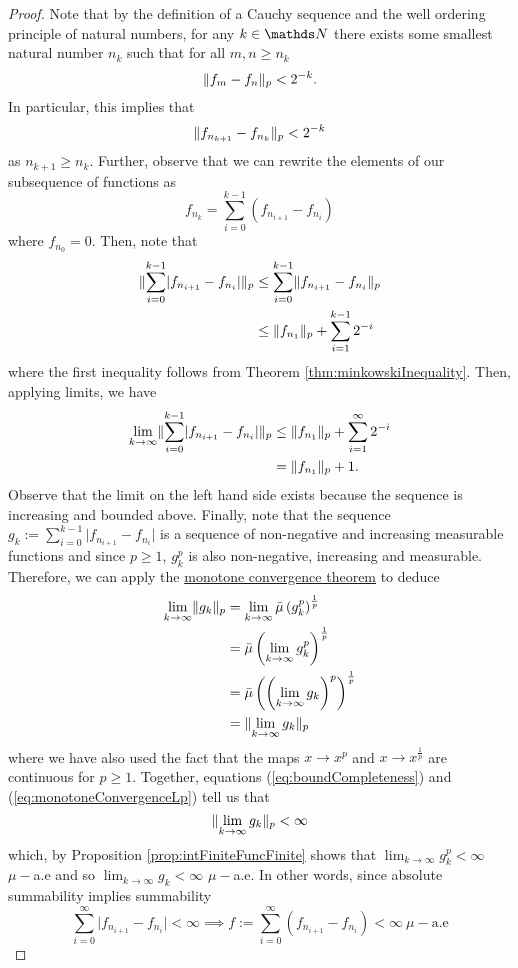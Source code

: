 \begin{proof}
Note that by the definition of a Cauchy sequence and the well ordering
principle of natural numbers, for any $k\in\N$ there exists some
smallest natural number $n_{k}$ such that for all $m,n\geq n_{k}$
\[
\lVert f_{m}-f_{n}\rVert_{p}<2^{-k}.
\]
In particular, this implies that 
\[
\lVert f_{n_{k+1}}-f_{n_{k}}\rVert_{p}<2^{-k}
\]
as $n_{k+1}\geq n_{k}$. Further, observe that we can rewrite the
elements of our subsequence of functions as 
\[
f_{n_{k}}=\sum_{i=0}^{k-1}\left(f_{n_{i+1}}-f_{n_{i}}\right)
\]
where $f_{n_{0}}=0.$ Then, note that 
\begin{align*}
\lVert\sum_{i=0}^{k-1}\lvert f_{n_{i+1}}-f_{n_{i}}\rvert\rVert_{p} & \leq\sum_{i=0}^{k-1}\lVert f_{n_{i+1}}-f_{n_{i}}\rVert_{p}\\
 & \leq\lVert f_{n_{1}}\rVert_{p}+\sum_{i=1}^{k-1}2^{-i}
\end{align*}
where the first inequality follows from Theorem \ref{thm:minkowskiInequality}.
Then, applying limits, we have
\begin{align}
\lim_{k\to\infty}\lVert\sum_{i=0}^{k-1}\lvert f_{n_{i+1}}-f_{n_{i}}\rvert\rVert_{p} & \leq\lVert f_{n_{1}}\rVert_{p}+\sum_{i=1}^{\infty}2^{-i}\nonumber \\
 & =\lVert f_{n_{1}}\rVert_{p}+1.\label{eq:boundCompleteness}
\end{align}
Observe that the limit on the left hand side exists because the sequence
is increasing and bounded above. Finally, note that the sequence $g_{k}:=\sum_{i=0}^{k-1}\lvert f_{n_{i+1}}-f_{n_{i}}\rvert$
is a sequence of non-negative and increasing measurable functions
and since $p\geq1$, $g_{k}^{p}$ is also non-negative, increasing
and measurable. Therefore, we can apply the \hyperref[thm:generalizedMonotoneConvergence]{monotone convergence theorem}
to deduce
\begin{align}
\lim_{k\to\infty}\lVert g_{k}\rVert_{p} & =\lim_{k\to\infty}\bar{\mu}\left(g_{k}^{p}\right)^{\frac{1}{p}}\nonumber \\
 & =\bar{\mu}\left(\lim_{k\to\infty}g_{k}^{p}\right)^{\frac{1}{p}}\nonumber \\
 & =\bar{\mu}\left(\left(\lim_{k\to\infty}g_{k}\right)^{p}\right)^{\frac{1}{p}}\nonumber \\
 & =\lVert\lim_{k\to\infty}g_{k}\rVert_{p}\label{eq:monotoneConvergenceLp}
\end{align}
where we have also used the fact that the maps $x\to x^{p}$ and $x\to x^{\frac{1}{p}}$
are continuous for $p\geq1.$ Together, equations (\ref{eq:boundCompleteness})
and (\ref{eq:monotoneConvergenceLp}) tell us that 
\[
\lVert\lim_{k\to\infty}g_{k}\rVert_{p}<\infty
\]
which, by Proposition \ref{prop:intFiniteFuncFinite} shows that $\lim_{k\to\infty}g_{k}^{p}<\infty$
$\mu-$a.e and so $\lim_{k\to\infty}g_{k}<\infty$ $\mu-$a.e. In
other words, since absolute summability implies summability
\[
\sum_{i=0}^{\infty}\lvert f_{n_{i+1}}-f_{n_{i}}\rvert<\infty\implies f:=\sum_{i=0}^{\infty}\left(f_{n_{i+1}}-f_{n_{i}}\right)<\infty\ \mu-\text{a.e}
\]


\end{proof}
